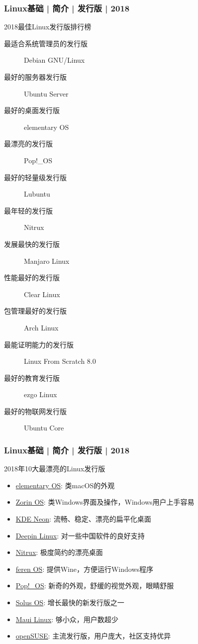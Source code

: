 \begin{frame}
  \frametitle{Linux基础 | 简介 | 发行版 | 2018}
  \begin{block}{2018最佳Linux发行版排行榜}
    \begin{description}
      \item[最适合系统管理员的发行版] Debian GNU/Linux
      \item[最好的服务器发行版] Ubuntu Server
      \item[最好的桌面发行版] elementary OS
      \item[最漂亮的发行版] Pop!\_OS 
      \item[最好的轻量级发行版] Lubuntu
      \item[最年轻的发行版] Nitrux
      \item[发展最快的发行版] Manjaro Linux 
      \item[性能最好的发行版] Clear Linux
      \item[包管理最好的发行版] Arch Linux
      \item[最能证明能力的发行版] Linux From Scratch 8.0
      \item[最好的教育发行版] ezgo Linux 
      \item[最好的物联网发行版] Ubuntu Core
    \end{description}
  \end{block}
\end{frame}

\begin{frame}
  \frametitle{Linux基础 | 简介 | 发行版 | 2018}
  \begin{block}{2018年10大最漂亮的Linux发行版}
    \begin{itemize}
      \item \href{https://elementary.io/}{elementary OS}: 类macOS的外观
      \item \href{https://zorinos.com/}{Zorin OS}: 类Windows界面及操作，Windows用户上手容易
      \item \href{https://neon.kde.org/}{KDE Neon}: 流畅、稳定、漂亮的扁平化桌面
      \item \href{http://www.deepin.com}{Deepin Linux}: 对一些中国软件的良好支持
      \item \href{https://nxos.org/}{Nitrux}: 极度简约的漂亮桌面
      \item \href{http://ferenos.weebly.com/}{feren OS}: 提供Wine，方便运行Windows程序
      \item \href{https://system76.com/pop}{Pop!\_OS}: 新奇的外观，舒缓的视觉外观，眼睛舒服
      \item \href{https://solus-project.com/}{Solus OS}: 增长最快的新发行版之一
      \item \href{https://mauilinux.org/}{Maui Linux}: 够小众，用户数超少
      \item \href{https://www.opensuse.org}{openSUSE}: 主流发行版，用户庞大，社区支持优异
    \end{itemize}
  \end{block}
\end{frame}

